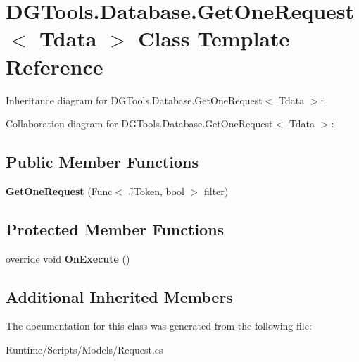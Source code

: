 \hypertarget{class_d_g_tools_1_1_database_1_1_get_one_request}{}\section{D\+G\+Tools.\+Database.\+Get\+One\+Request$<$ Tdata $>$ Class Template Reference}
\label{class_d_g_tools_1_1_database_1_1_get_one_request}


Inheritance diagram for D\+G\+Tools.\+Database.\+Get\+One\+Request$<$ Tdata $>$\+:


Collaboration diagram for D\+G\+Tools.\+Database.\+Get\+One\+Request$<$ Tdata $>$\+:
\subsection*{Public Member Functions}
\begin{DoxyCompactItemize}
\item 
\mbox{\label{class_d_g_tools_1_1_database_1_1_get_one_request_acd96d7822337e4b7231d86f2ad47cbd7}} 
{\bfseries Get\+One\+Request} (Func$<$ J\+Token, bool $>$ \mbox{\hyperlink{class_d_g_tools_1_1_database_1_1_get_request_aeb636422673999df2a0511b1507428cb}{filter}})
\end{DoxyCompactItemize}
\subsection*{Protected Member Functions}
\begin{DoxyCompactItemize}
\item 
\mbox{\label{class_d_g_tools_1_1_database_1_1_get_one_request_a870f5ac137b1ed0719d9ef443b44dac9}} 
override void {\bfseries On\+Execute} ()
\end{DoxyCompactItemize}
\subsection*{Additional Inherited Members}


The documentation for this class was generated from the following file\+:\begin{DoxyCompactItemize}
\item 
Runtime/\+Scripts/\+Models/Request.\+cs\end{DoxyCompactItemize}
